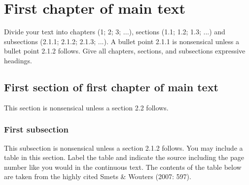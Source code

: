 \section{First chapter of main text}

Divide your text into chapters (1; 2; 3; ...), sections (1.1; 1.2; 1.3; ...) and subsections (2.1.1; 2.1.2; 2.1.3; ...). A bullet point 2.1.1 is nonsensical unless a bullet point 2.1.2 follows. Give all chapters, sections, and subsections expressive headings.
\newpage

\subsection{First section of first chapter of main text}
This section is nonsensical unless a section 2.2 follows.

\subsubsection{First subsection}
This subsection is nonsensical unless a section 2.1.2 follows. You may include a table in this section. Label the table and indicate the source including the page number like you would in the continuous text. The contents of the table below are taken from the highly cited Smets \& Wouters (2007: 597).
